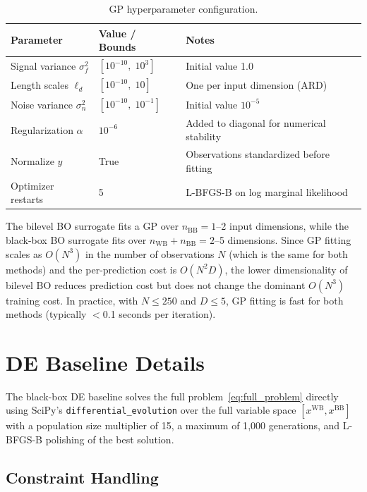 \documentclass[12pt,a4paper]{article}%
\theoremstyle{plain}%
\theoremstyle{remark}%
\theoremstyle{definition}%
\def\WB{\mathrm{WB}}
\def\BB{\mathrm{BB}}
\begin{document}
\begin{appendices}
\begin{table}[htbp]
\centering
\caption{GP hyperparameter configuration.}
\label{tab:gp_hyperparams}
\begin{tabular}{@{}lll@{}}
\toprule
\textbf{Parameter} & \textbf{Value / Bounds} & \textbf{Notes} \\
\midrule
Signal variance $\sigma_f^2$ & $[10^{-10},\; 10^3]$ & Initial value 1.0 \\
Length scales $\ell_d$ & $[10^{-10},\; 10]$ & One per input dimension (ARD) \\
Noise variance $\sigma_n^2$ & $[10^{-10},\; 10^{-1}]$ & Initial value $10^{-5}$ \\
Regularization $\alpha$ & $10^{-6}$ & Added to diagonal for numerical stability \\
Normalize $y$ & True & Observations standardized before fitting \\
Optimizer restarts & 5 & L-BFGS-B on log marginal likelihood \\
\bottomrule
\end{tabular}
\end{table}

The bilevel BO surrogate fits a GP over $n_{\BB} = 1$--2 input dimensions, while the black-box BO surrogate fits over $n_{\WB}+n_{\BB} = 2$--5 dimensions. Since GP fitting scales as $O(N^3)$ in the number of observations $N$ (which is the same for both methods) and the per-prediction cost is $O(N^2 D)$, the lower dimensionality of bilevel BO reduces prediction cost but does not change the dominant $O(N^3)$ training cost. In practice, with $N \leq 250$ and $D \leq 5$, GP fitting is fast for both methods (typically $<$0.1 seconds per iteration).

\section{DE Baseline Details}\label{sec:nlp_details}

The black-box DE baseline solves the full problem~\eqref{eq:full_problem} directly using SciPy's \texttt{differential\_evolution} over the full variable space $[x^{\WB}, x^{\BB}]$ with a population size multiplier of 15, a maximum of 1{,}000 generations, and L-BFGS-B polishing of the best solution.

\subsection{Constraint Handling}\label{subsec:de_constraints}


\end{appendices}
\end{document}
